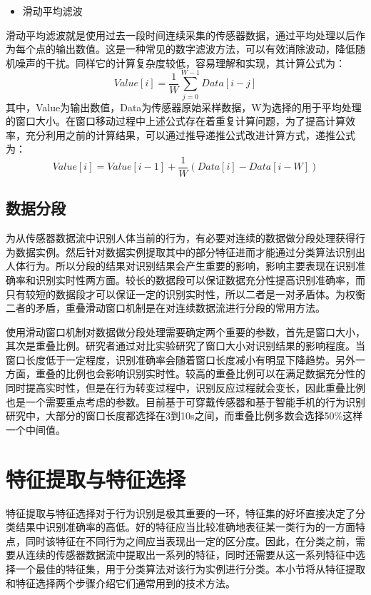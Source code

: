 \begin{itemize}
	\item 滑动平均滤波
\end{itemize}

\par 滑动平均滤波就是使用过去一段时间连续采集的传感器数据，通过平均处理以后作为每个点的输出数值。这是一种常见的数字滤波方法，可以有效消除波动，降低随机噪声的干扰。同样它的计算复杂度较低，容易理解和实现，其计算公式为：
\begin{equation}
	Value[i] = \frac{1}{W}\sum_{j=0}^{W-1}Data[i-j]
\end{equation}
其中，Value为输出数值，Data为传感器原始采样数据，W为选择的用于平均处理的窗口大小。在窗口移动过程中上述公式存在着重复计算问题，为了提高计算效率，充分利用之前的计算结果，可以通过推导递推公式改进计算方式，递推公式为：
\begin{equation}
	Value[i] = Value[i-1] + \frac{1}{W}(Data[i] - Data[i-W])
\end{equation}

\subsection{数据分段}
\par 为从传感器数据流中识别人体当前的行为，有必要对连续的数据做分段处理获得行为数据实例。然后针对数据实例提取其中的部分特征进而才能通过分类算法识别出人体行为。所以分段的结果对识别结果会产生重要的影响，影响主要表现在识别准确率和识别实时性两方面。较长的数据段可以保证数据充分性提高识别准确率，而只有较短的数据段才可以保证一定的识别实时性，所以二者是一对矛盾体。为权衡二者的矛盾，重叠滑动窗口机制是在对连续数据流进行分段的常用方法。
\par 使用滑动窗口机制对数据做分段处理需要确定两个重要的参数，首先是窗口大小，其次是重叠比例。研究者通过对比实验研究了窗口大小对识别结果的影响程度。当窗口长度低于一定程度，识别准确率会随着窗口长度减小有明显下降趋势。另外一方面，重叠的比例也会影响识别实时性。较高的重叠比例可以在满足数据充分性的同时提高实时性，但是在行为转变过程中，识别反应过程就会变长，因此重叠比例也是一个需要重点考虑的参数。目前基于可穿戴传感器和基于智能手机的行为识别研究中，大部分的窗口长度都选择在3到10s之间，而重叠比例多数会选择50\%这样一个中间值。

\section{特征提取与特征选择}
\par 特征提取与特征选择对于行为识别是极其重要的一环，特征集的好坏直接决定了分类结果中识别准确率的高低。好的特征应当比较准确地表征某一类行为的一方面特点，同时该特征在不同行为之间应当表现出一定的区分度。因此，在分类之前，需要从连续的传感器数据流中提取出一系列的特征，同时还需要从这一系列特征中选择一个最佳的特征集，用于分类算法对该行为实例进行分类。本小节将从特征提取和特征选择两个步骤介绍它们通常用到的技术方法。

